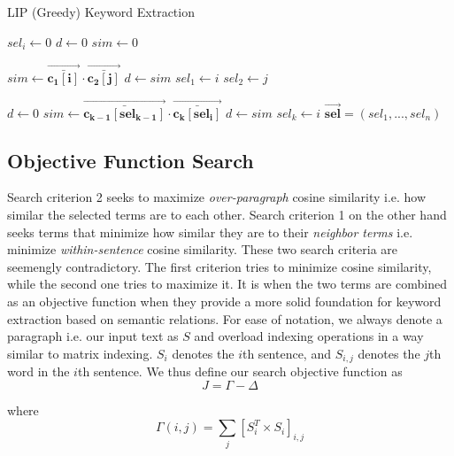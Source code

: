 \documentclass[12pt]{article}
\begin{document}
\begin{algorithm}[H]
\caption{LIP (Greedy) Keyword Extraction}\label{euclid}
\begin{algorithmic}[1]
\State $sel_i \gets 0$
 \EndFor
\State $d \gets 0$
\State $sim \gets 0$

            \State$sim \gets\bm{\vec{\bar{c_1[i]}}} \cdot \bm{\vec{\bar{c_2[j]}}}$
              \State $d \gets sim$
              \State$ sel_1 \gets i$
              \State $ sel_2 \gets j$
         \EndIf
        \EndFor
\EndFor

    \State $d \gets 0$
        \State$sim \gets \bm{\vec{\bar{c_{k-1}[sel_{k-1}]}}} \cdot \bm{\vec{\bar{c_{k}[sel_{i}]}}}$
              \State$d \gets sim$
              \State$sel_k \gets i$
        \EndIf
    \EndFor
\EndFor
\Return $\bm{\vec{sel}} = (sel_1, ..., sel_n)$

\EndProcedure
\end{algorithmic}
\end{algorithm}


\subsection{Objective Function Search}
Search criterion 2 seeks to maximize \textit{over-paragraph} cosine similarity i.e. how similar the selected terms are to each other. Search criterion 1 on the other hand seeks terms that minimize how similar they are to their \textit{neighbor terms} i.e. minimize \textit{within-sentence} cosine similarity. These two search criteria are seemengly contradictory. The first criterion tries to minimize cosine similarity, while the second one tries to maximize it. It is when the two terms are combined as an objective function when they provide a more solid foundation for keyword extraction based on semantic relations. For ease of notation, we always denote a paragraph i.e. our input text as $S$ and overload indexing operations in a way similar to matrix indexing. $S_{i}$ denotes the $i$th sentence, and $S_{i,j}$ denotes the $j$th word in the $i$th sentence. We thus define our search objective function as
\[J = \Gamma - \Delta\]

where
\[\Gamma(i,j) = \sum\limits_{j} [S_{i}^ T \times S_{i}]_{i,j}\]
\end{document}
